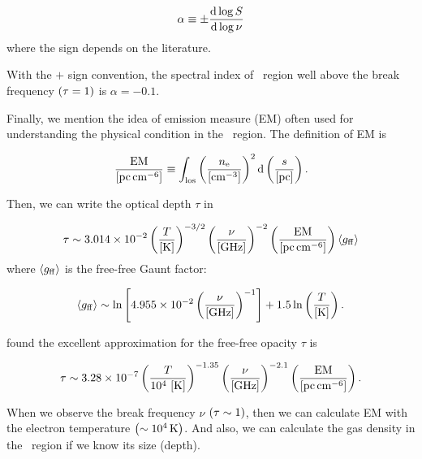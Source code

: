 \begin{equation}\label{eq:essential_radio4n55}
    \alpha \equiv \pm \frac{\mathrm{d} \log S}{\mathrm{d} \log \nu}
\end{equation}
where the sign depends on the literature.

With the $+$ sign convention, the spectral index of \ih~region well above the break frequency $\left(\tau=1\right)$ is $\alpha=-0.1$.\\ \vspace{0.2cm}

Finally, we mention the idea of emission measure (EM) often used for understanding the physical condition in the \ih~region.
The definition of EM is

\begin{equation}\label{eq:essential_radio4n57}
    \frac{\mathrm{EM}}{\left[\mathrm{pc} \, \mathrm{cm}^{-6}\right]} \equiv \int_{\mathrm{los}}\left(\frac{n_{\mathrm{e}}}{\left[\mathrm{cm}^{-3}\right]}\right)^2 \mathrm{d}\left(\frac{s}{\left[\mathrm{pc}\right]}\right).
\end{equation}

Then, we can write the optical depth $\tau$ in

\begin{equation}\label{eq:essential_radio4n58}
    \tau \sim 3.014 \times 10^{-2}\left(\frac{T}{\left[\mathrm{K}\right]}\right)^{-3/2}\left(\frac{\nu}{\left[\mathrm{GHz}\right]}\right)^{-2}\left(\frac{\mathrm{EM}}{\left[\mathrm{pc}\,\mathrm{cm}^{-6}\right]}\right)\left\langle g_{\mathrm{ff}}\right\rangle
\end{equation}
where $\left\langle g_{\mathrm{ff}}\right\rangle$ is the free-free Gaunt factor:

\begin{equation}\label{eq:essential_radio4n59}
    \left\langle g_{\mathrm{ff}}\right\rangle \sim \ln \left[4.955 \times 10^{-2}\left(\frac{\nu}{\left[\mathrm{GHz}\right]}\right)^{-1}\right]+1.5 \ln \left(\frac{T}{\left[\mathrm{K}\right]}\right).
\end{equation}

\citet{Mezger1967} found the excellent approximation for the free-free opacity $\tau$ is

\begin{equation}\label{eq:essential_radio4n60}
    \tau \sim 3.28 \times 10^{-7}\left(\frac{T}{10^4\,\left[\mathrm{K}\right]}\right)^{-1.35}\left(\frac{\nu}{\left[\mathrm{GHz}\right]}\right)^{-2.1}\left(\frac{\mathrm{EM}}{\left[\mathrm{pc} \, \mathrm{cm}^{-6}\right]}\right).
\end{equation}

When we observe the break frequency $\nu$ $\left(\tau \sim 1\right)$, then we can calculate EM with the electron temperature $\left(\sim10^4\,\mathrm{K}\right)$.
And also, we can calculate the gas density in the \ih~region if we know its size (depth).






